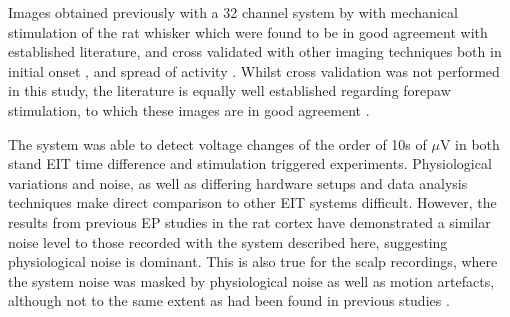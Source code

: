 Images obtained previously with a 32 channel system by \citet{Aristovich_2016} with mechanical stimulation of the rat whisker which were found to be in good agreement with established literature, and cross validated with other imaging techniques both in initial onset \cite{armstrong1991thalamo}, and spread of activity \cite{petersen2007functional}. Whilst cross validation was not performed in this study, the literature is equally well established regarding forepaw stimulation, to which these images are in good agreement \cite{peeters2001comparing} \cite{masamoto2007relationship} \cite{lowe2007small}.





The system was able to detect voltage changes of the order of 10s of $\mu$V in both stand EIT time difference and stimulation triggered experiments. Physiological variations and noise, as well as differing hardware setups and data analysis techniques make direct comparison to other EIT systems difficult. However, the results from previous EP studies \cite{Oh2011} in the rat cortex have demonstrated a similar noise level to those recorded with the system described here, suggesting physiological noise is dominant. This is also true for the scalp recordings, where the system noise was masked by physiological noise as well as motion artefacts, although not to the same extent as had been found in previous studies \cite{Fabrizi_2006}. 

